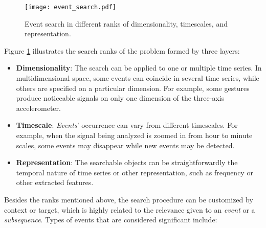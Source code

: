 \begin{figure}[H]
    \centering
    \texttt{[image: event\_search.pdf]}
    \caption{Event search in different ranks of dimensionality, timescales, and representation.}
    \label{fig:event_search}
\end{figure}




Figure \ref{fig:event_search} illustrates the search ranks of the problem formed by three layers:

\begin{itemize}
    \item \textbf{Dimensionality}: The search can be applied to one or multiple time series. In multidimensional space, some events can coincide in several time series, while others are specified on a particular dimension. For example, some gestures produce noticeable signals on only one dimension of the three-axis accelerometer.
    \item \textbf{Timescale}: \textit{Events}' occurrence can vary from different timescales. For example, when the signal being analyzed is zoomed in from hour to minute scales, some events may disappear while new events may be detected.
    \item \textbf{Representation}: The searchable objects can be straightforwardly the temporal nature of time series or other representation, such as frequency or other extracted features.
\end{itemize}

Besides the ranks mentioned above, the search procedure can be customized by context or target, which is highly related to the relevance given to an \textit{event} or a \textit{subsequence}. Types of events that are considered significant include:

